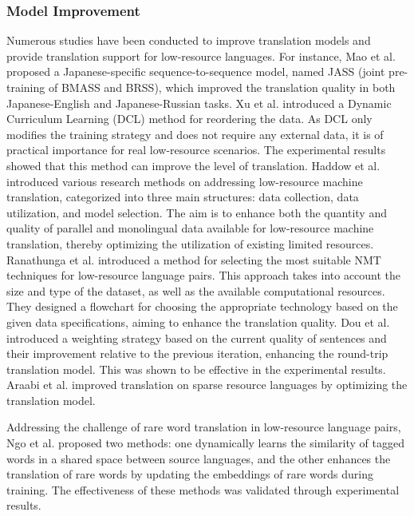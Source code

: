 \documentclass[acmsmall]{acmart}
\begin{document}
\subsubsection{Model Improvement}

Numerous studies have been conducted to improve translation models and provide translation support for low-resource languages. For instance, Mao et al. \cite{n4-1} proposed a Japanese-specific sequence-to-sequence model, named JASS (joint pre-training of BMASS and BRSS), which improved the translation quality in both Japanese-English and Japanese-Russian tasks. Xu et al.  \cite{n4-2} introduced a Dynamic Curriculum Learning (DCL) method for reordering the data. As DCL only modifies the training strategy and does not require any external data, it is of practical importance for real low-resource scenarios. The experimental results showed that this method can improve the level of translation. 
\color{green}Haddow et al. \cite{DBLP:journals/corr/abs-2109-00486} introduced various research methods on addressing low-resource machine translation, categorized into three main structures: data collection, data utilization, and model selection. The aim is to enhance both the quantity and quality of parallel and monolingual data available for low-resource machine translation, thereby optimizing the utilization of existing limited resources. Ranathunga et al. \cite{DBLP:journals/corr/abs-2106-15115} introduced a method for selecting the most suitable NMT techniques for low-resource language pairs. This approach takes into account the size and type of the dataset, as well as the available computational resources. They designed a flowchart for choosing the appropriate technology based on the given data specifications, aiming to enhance the translation quality. \color{black} Dou et al. \cite{n4-3} introduced a weighting strategy based on the current quality of sentences and their improvement relative to the previous iteration, enhancing the round-trip translation model. This was shown to be effective in the experimental results. Araabi et al. \cite{n4-4} improved translation on sparse resource languages by optimizing the translation model.

Addressing the challenge of rare word translation in low-resource language pairs, Ngo et al. \cite{n4-5} proposed two methods: one dynamically learns the similarity of tagged words in a shared space between source languages, and the other enhances the translation of rare words by updating the embeddings of rare words during training. The effectiveness of these methods was validated through experimental results.
\end{document}
